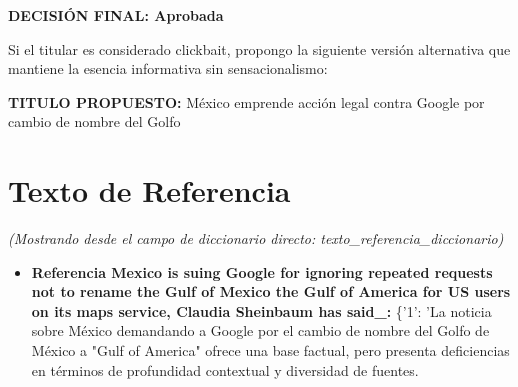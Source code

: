 \documentclass[10pt,a4paper]{article}
\begin{document}
\par\medskip
\textbf{DECISI\'{O}N FINAL: Aprobada}
\par\medskip
Si el titular es considerado clickbait, propongo la siguiente versi\'{o}n alternativa que mantiene la esencia informativa sin sensacionalismo:
\par\medskip
\textbf{TITULO PROPUESTO:} M\'{e}xico emprende acci\'{o}n legal contra Google por cambio de nombre del Golfo
        \vspace{1em}
\vspace{1em}

\section*{Texto de Referencia}
    \textit{(Mostrando desde el campo de diccionario directo: texto\_referencia\_diccionario)}
    \begin{itemize}[leftmargin=*]
            \item \textbf{Referencia Mexico is suing Google for ignoring repeated requests not to rename the Gulf of Mexico the Gulf of America for US users on its maps service, Claudia Sheinbaum has said\_:} \{'1': 'La noticia sobre M\'{e}xico demandando a Google por el cambio de nombre del Golfo de M\'{e}xico a "Gulf of America" ofrece una base factual, pero presenta deficiencias en t\'{e}rminos de profundidad contextual y diversidad de fuentes.
    \end{itemize}
\vspace{1em}


\end{document}
